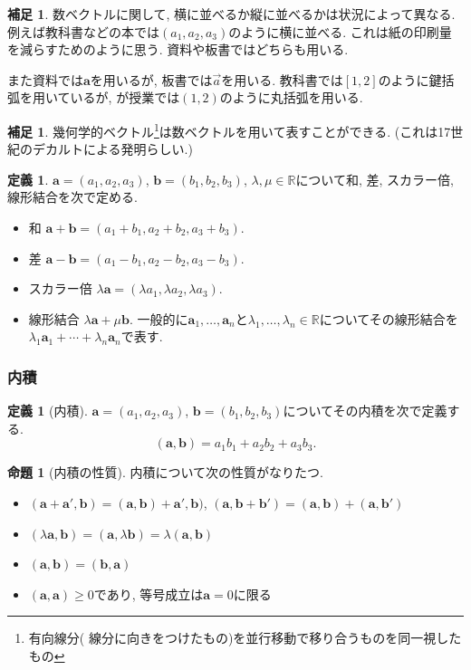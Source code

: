 \documentclass[dvipdfmx,a4paper,11pt]{article} %
\newcommand{\R}{\mathbb{R}}
\theoremstyle{definition}
\newtheorem{prop}[thm]{命題}
\newtheorem{dfn}[thm]{定義}
\newtheorem{rem}[thm]{補足}
\begin{document}
       
 
     \begin{rem}
     数ベクトルに関して, 横に並べるか縦に並べるかは状況によって異なる. 例えば教科書などの本では$(a_1, a_2, a_3)$のように横に並べる. これは紙の印刷量を減らすためのように思う. 資料や板書ではどちらも用いる.
     
     また資料では$\bm{a}$を用いるが, 板書では$\overset{\to}{a}$を用いる.
     教科書では$[1,2]$のように鍵括弧を用いているが, が授業では$(1,2)$のように丸括弧を用いる. 
     \end{rem}
     
 \begin{rem}
幾何学的ベクトル\footnote{有向線分( 線分に向きをつけたもの)を並行移動で移り合うものを同一視したもの}は数ベクトルを用いて表すことができる. (これは17世紀のデカルトによる発明らしい.)
 \end{rem}


    \begin{dfn}
$\bm{a}= (a_1, a_2, a_3)$, $ \bm{b}=(b_1, b_2, b_3)$, $\lambda, \mu \in \R$について和, 差, スカラー倍, 線形結合を次で定める. 
\begin{itemize}

\item 和 $\bm{a} + \bm{b} = (a_1 + b_1, a_2 + b_2, a_3 + b_3)$.
\item 差 $\bm{a} - \bm{b} =(a_1 - b_1, a_2 - b_2, a_3 - b_3)$.
\item スカラー倍 $\lambda \bm{a} = (\lambda a_1, \lambda a_2, \lambda a_3)$.
\item 線形結合 $\lambda\bm{a} + \mu\bm{b}$. 一般的に$\bm{a}_1, \ldots, \bm{a}_n$と$\lambda_1, \ldots, \lambda_n \in \R$についてその線形結合を$\lambda_1\bm{a}_1 + \cdots + \lambda_n\bm{a}_n $で表す.
\end{itemize}
    \end{dfn}

\subsubsection{内積}

    \begin{dfn}[内積]
$\bm{a}= (a_1, a_2, a_3)$, 
$ \bm{b}=(b_1, b_2, b_3)$についてその内積を次で定義する. 
$$
(\bm{a}, \bm{b})
=
a_1 b_1 + a_2 b_2 + a_3 b_3.
$$
    \end{dfn}
\begin{prop}[内積の性質]
内積について次の性質がなりたつ.
\begin{itemize}
\item $(\bm{a} + \bm{a}', \bm{b})=(\bm{a}, \bm{b}) + \bm{a}', \bm{b})$, 
$(\bm{a}, \bm{b}+ \bm{b}')=(\bm{a}, \bm{b})+(\bm{a}, \bm{b}')$
\item $(\lambda \bm{a}, \bm{b})=(\bm{a}, \lambda \bm{b})=\lambda (\bm{a}, \bm{b})$
\item $(\bm{a}, \bm{b})=(\bm{b}, \bm{a})$
\item  $(\bm{a}, \bm{a}) \ge 0$であり, 等号成立は$\bm{a}=0$に限る
\end{itemize}
\end{prop}
\end{document}
